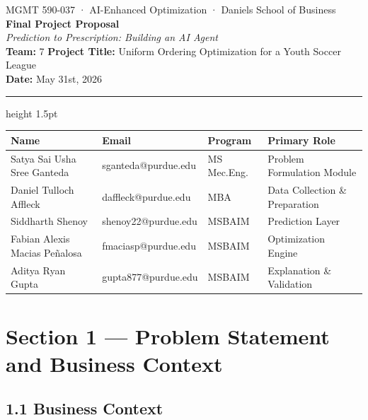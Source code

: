 \documentclass[11pt]{article}
\begin{document}
\begin{center}
  {\small\color{navyblue}
    MGMT 590-037 \;·\; AI-Enhanced Optimization \;·\; Daniels School of Business}\\[4pt]
  {\LARGE\bfseries\color{navyblue} Final Project Proposal}\\[3pt]
  {\large\itshape Prediction to Prescription: Building an AI Agent}\\[4pt]
  {\small
    \textbf{Team:} 7 \quad
    \textbf{Project Title:} Uniform Ordering Optimization for a Youth Soccer League\\ \quad
    \textbf{Date:} May 31st, 2026
  }
\end{center}

\vspace{3pt}\hrule height 1.5pt\vspace{6pt}

\begin{center}
\small
\begin{tabular}{llll}
\toprule
\textbf{Name} & \textbf{Email} & \textbf{Program} & \textbf{Primary Role} \\
\midrule
Satya Sai Usha Sree Ganteda     & sganteda@purdue.edu  & MS Mec.Eng.  & Problem Formulation Module \\
Daniel Tulloch Affleck           & daffleck@purdue.edu  & MBA & Data Collection \& Preparation \\
Siddharth Shenoy                 & shenoy22@purdue.edu  & MSBAIM & Prediction Layer \\
Fabian Alexis Macias Pe\~nalosa  & fmaciasp@purdue.edu  & MSBAIM & Optimization Engine \\
Aditya Ryan Gupta                & gupta877@purdue.edu  & MSBAIM & Explanation \& Validation \\
\bottomrule
\end{tabular}
\end{center}

\vspace{2pt}

\section{Section 1 — Problem Statement and Business Context}

\subsection*{1.1 \; Business Context}
\end{document}
